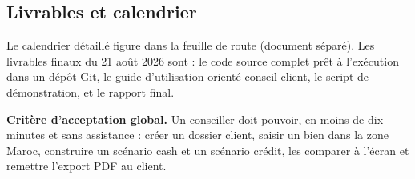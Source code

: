 \documentclass[11pt,a4paper]{article}
\begin{document}
	\subsection{Livrables et calendrier}
	Le calendrier détaillé figure dans la feuille de route (document séparé). Les livrables finaux du 21 août 2026 sont : le code source complet prêt à l'exécution dans un dépôt Git, le guide d'utilisation orienté conseil client, le script de démonstration, et le rapport final.

	\vspace{0.6cm}

	\begin{tcolorbox}[colback=eccblue!5,colframe=eccblue!60,boxrule=0.6pt,arc=2pt,
		left=8pt,right=8pt,top=6pt,bottom=6pt]
		\small
		\textbf{\color{eccblue}Critère d'acceptation global.} Un conseiller doit pouvoir, en moins de dix minutes et sans assistance : créer un dossier client, saisir un bien dans la zone Maroc, construire un scénario cash et un scénario crédit, les comparer à l'écran et remettre l'export PDF au client.
	\end{tcolorbox}
\end{document}
